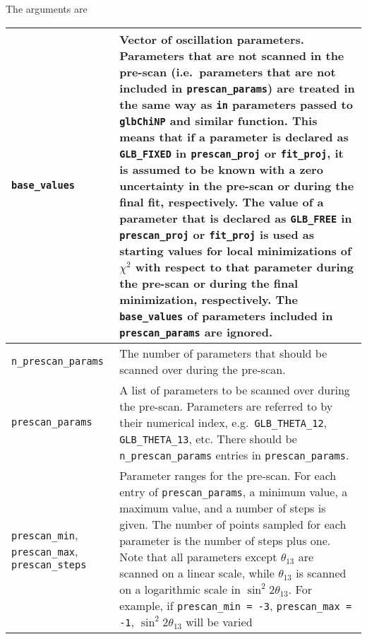 \documentclass{article}
\begin{document}
\noindent The arguments are \\
\begin{longtable}{p{3cm}p{9cm}}
  \toprule
  {\tt base\_values} & Vector of oscillation parameters.
                       Parameters that are not scanned in the pre-scan (i.e.\ parameters
                       that are not included in {\tt prescan\_params}) are treated in
                       the same way as {\tt in} parameters passed to {\tt glbChiNP}
                       and similar function. This means that if a parameter is declared as
                       {\tt GLB\_FIXED} in {\tt prescan\_proj} or {\tt fit\_proj}, it is
                       assumed to be known with a zero uncertainty in the pre-scan or
                       during the final fit, respectively. The value of a parameter that
                       is declared as {\tt GLB\_FREE} in {\tt prescan\_proj} or {\tt fit\_proj}
                       is used as starting values for local minimizations of $\chi^2$ with
                       respect to that parameter during the pre-scan or during the final
                       minimization, respectively. The {\tt base\_values} of parameters included in
                       {\tt prescan\_params} are ignored. \\\midrule
  {\tt n\_prescan\_params} & The number of parameters that should be scanned over during
                             the pre-scan. \\\midrule
  {\tt prescan\_params}    & A list of parameters to be scanned over during the pre-scan.
                             Parameters are referred to by their numerical index, e.g.\
                             {\tt GLB\_THETA\_12}, {\tt GLB\_THETA\_13}, etc. There should
                             be {\tt n\_prescan\_params} entries in {\tt prescan\_params}. \\\midrule
  {\tt prescan\_min}, {\tt prescan\_max}, {\tt prescan\_steps}
                           & Parameter ranges for the pre-scan. For each entry of
                             {\tt prescan\_params}, a minimum value, a maximum value, and
                             a number of steps is given. The number of points sampled for
                             each parameter is the number of steps plus one. Note that all
                             parameters except $\theta_{13}$ are scanned on a linear scale,
                             while $\theta_{13}$ is scanned on a logarithmic scale in
                             $\sin^2 2\theta_{13}$. For example, if {\tt prescan\_min = -3},
                             {\tt prescan\_max = -1}, $\sin^2 2\theta_{13}$ will be varied

\end{longtable}
\end{document}
